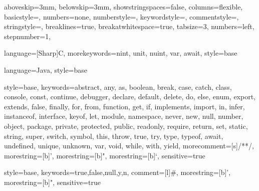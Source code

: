 \usepackage{listings}

 {
  aboveskip=3mm,
  belowskip=3mm,
  showstringspaces=false,
  columns=flexible,
  basicstyle={\small\ttfamily},
  numbers=none,
  numberstyle=\tiny\color{gray},
  keywordstyle=\color{blue},
  commentstyle=\color{dkgreen},
  stringstyle=\color{string},
  breaklines=true,
  breakatwhitespace=true,
  tabsize=3,
  numbers=left,
  stepnumber=1,
}

 {%
  language=[Sharp]C, 
  morekeywords={nint, unit, nuint, var, await},
  style=base
}


 {%
  language=Java, 
  style=base
}


 {
  style=base,
  keywords={abstract, any, as, boolean, break, case, catch, class, console, 
    const, continue, debugger, declare, default, delete, do, else, enum, export, 
    extends, false, finally, for, from, function, get, if, implements, import, in, 
    infer, instanceof, interface, keyof, let, module, namespace, never, new, null, 
    number, object, package, private, protected, public, readonly, require, return, 
    set, static, string, super, switch, symbol, this, throw, true, try, type, typeof, await,
    undefined, unique, unknown, var, void, while, with, yield},
  morecomment=[s]{/*}{*/},
  morestring=[b]',
  morestring=[b]",
  morestring=[b]`,
  sensitive=true
}


 {
  style=base,
  keywords={true,false,null,y,n},
  comment=[l]{\#},
  morestring=[b]',
  morestring=[b]",
  sensitive=true
}